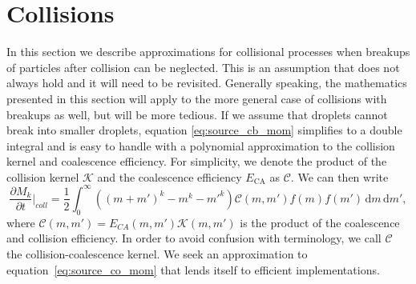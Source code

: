 \documentclass{report}
\begin{document}
\section{Collisions}
In this section we describe approximations for collisional processes when breakups of particles after collision can be neglected. This is an assumption that does not always hold and it will need to be revisited. Generally speaking, the mathematics presented in this section will apply to the more general case of collisions with breakups as well, but will be more tedious. If we assume that droplets cannot break into smaller droplets, equation \eqref{eq:source_cb_mom} simplifies to a double integral and is easy to handle with a polynomial approximation to the collision kernel and coalescence efficiency. For simplicity, we denote the product of the collision kernel $\mathcal{K}$ and the coalescence efficiency $E_\mathrm{CA}$ as $\mathcal{C}$. We can then write
\begin{equation}
    \frac{\partial M_k}{\partial t} \biggr\rvert_{coll} = \frac{1}{2}\int_0^\infty \left((m+m')^k - m^k - {m'}^k\right) \mathcal{C}(m, m')f(m)f(m') \, \text{d}m\, \text{d}m',
\label{eq:source_co_mom}
\end{equation}
where $\mathcal{C}(m, m') = E_{CA}(m, m') \mathcal{K}(m, m')$ is the product of the coalescence and collision efficiency. In order to avoid confusion with terminology, we call $\mathcal{C}$ the collision-coalescence kernel. We seek an approximation to equation~\eqref{eq:source_co_mom} that lends itself to efficient implementations.
\end{document}
